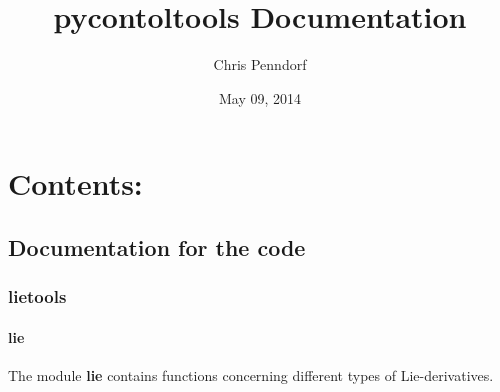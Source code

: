 \documentclass[letterpaper,10pt,english]{sphinxmanual}
\title{pycontoltools Documentation}
\date{May 09, 2014}
\author{Chris Penndorf}
\begin{document}
\maketitle
\tableofcontents
{}\label{index::doc}



\chapter{Contents:}
\label{index:documentation-of-the-python-module-pycontroltools}\label{index:contents}

\section{Documentation for the code}
\label{pycontroltools::doc}\label{pycontroltools:documentation-for-the-code}

\subsection{\textbf{lietools}}
\label{pycontroltools:lietools}

\subsubsection{\textbf{lie}}
\label{pycontroltools:lie}
The module \textbf{lie} contains functions concerning
different types of Lie-derivatives.
\label{pycontroltools:module-lietools.lietools}\label{pycontroltools:module-lie}
\end{document}
